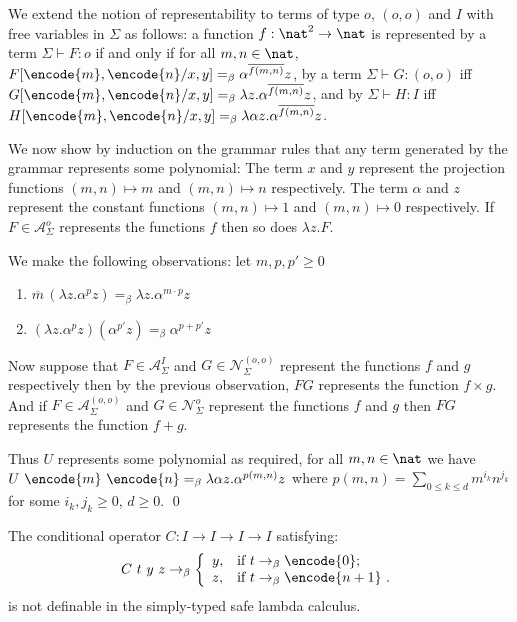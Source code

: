 We extend the notion of representability to terms of type $o$,
$(o,o)$ and $I$ with free variables in $\Sigma$ as follows: a
function $f:\nat^2 \rightarrow \nat$ is represented by a term
$\Sigma \vdash F:o$ if and only if for all $m,n\in\nat$,
$F[\encode{m}, \encode{n}/x,y] =_\beta \alpha^{\overline{f(m,n)}}
z$, by a term $\Sigma \vdash G:(o,o)$ iff $G[\encode{m},
\encode{n}/x,y] =_\beta \lambda z . \alpha^{\overline{f(m,n)}} z$,
and by $\Sigma \vdash H:I$ iff $H[\encode{m}, \encode{n}/x,y]
=_\beta \lambda \alpha z . \alpha^{\overline{f(m,n)}} z$.

We now show by induction on the grammar rules that any term
generated by the grammar represents some polynomial: The term $x$
and $y$ represent the projection functions $(m,n)\mapsto m$ and
$(m,n)\mapsto n$ respectively. The term $\alpha$ and $z$ represent
the constant functions $(m,n)\mapsto 1$ and $(m,n)\mapsto 0$
respectively. If $F\in \mathcal{A}^o_\Sigma$ represents the
functions $f$ then so does $\lambda z. F$.

We make the following observations: let $m, p, p' \geq 0$
\begin{enumerate}
\item ${\overline m} \, (\lambda z.\alpha^p z) =_\beta \lambda z . \alpha^{m \cdot p} z$
\item $(\lambda z.\alpha^p z) (\alpha^{p'} z) =_\beta \alpha^{p + p'} z$
\end{enumerate}

Now suppose that $F\in \mathcal{A}^I_\Sigma$ and $G\in
\mathcal{N}^{(o,o)}_\Sigma$ represent the functions $f$ and $g$
respectively then by the previous observation, $F G$ represents the
function $f \times g$. And if $F\in \mathcal{A}^{(o,o)}_\Sigma$ and
$G\in \mathcal{N}^o_\Sigma$ represent the functions $f$ and $g$ then
$F G$ represents the function $f+g$.

Thus $U$ represents some polynomial as required, \ie for all $m,n\in
\nat$ we have $U~\encode{m}~\encode{n} =_\beta \lambda \alpha z .
\alpha^{p(m,n)} z$ where $p(m,n) = \sum_{0\leq k \leq d} m^{i_k}
n^{j_k}$ for some $i_k,j_k \geq 0$, $d\geq 0$. \qed
%


\begin{corollary}
The conditional operator $C:I\rightarrow I\rightarrow I \rightarrow
I$ satisfying:
$$
C~t~y~z \rightarrow_\beta \left\{
                            \begin{array}{ll}
                              y, & \hbox{if $t
\rightarrow_\beta \encode{0}$;} \\
                              z, & \hbox{if
$t \rightarrow_\beta \encode{n+1}$ .}
                            \end{array}
                          \right.
$$
is not definable in the simply-typed safe lambda calculus.
\end{corollary}


